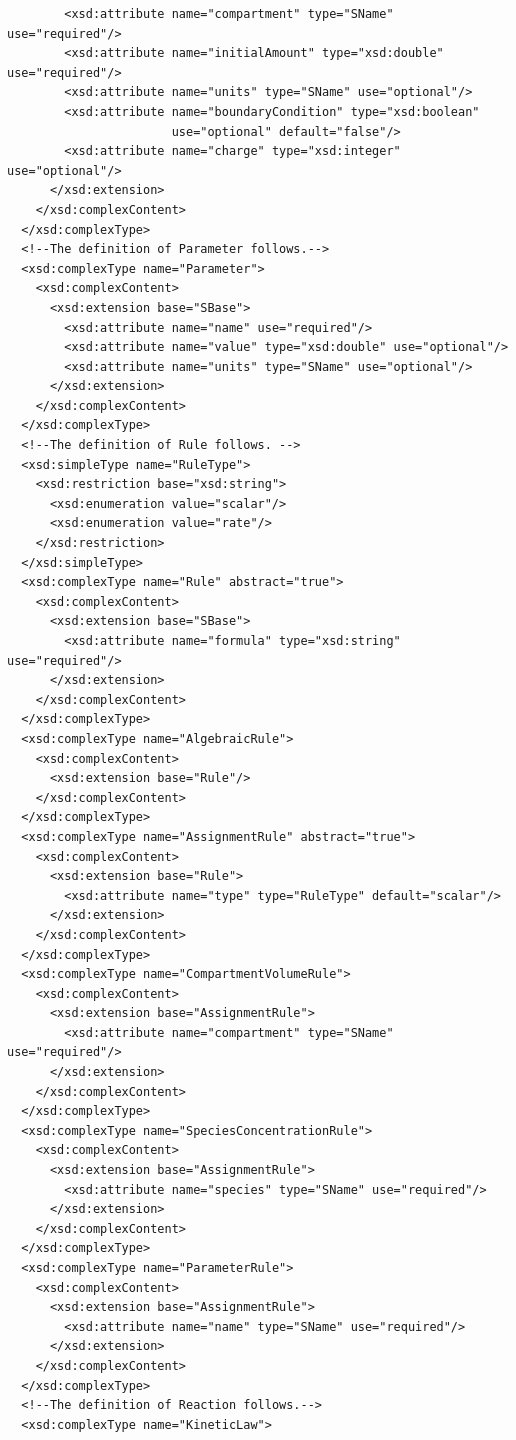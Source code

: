 \documentclass[10pt]{cekarticle}
\begin{document}
\begin{small}
\begin{verbatim}
      	<xsd:attribute name="compartment" type="SName" use="required"/>
      	<xsd:attribute name="initialAmount" type="xsd:double" use="required"/>
      	<xsd:attribute name="units" type="SName" use="optional"/>
      	<xsd:attribute name="boundaryCondition" type="xsd:boolean"
                       use="optional" default="false"/>
      	<xsd:attribute name="charge" type="xsd:integer" use="optional"/>
      </xsd:extension>
    </xsd:complexContent>
  </xsd:complexType>
  <!--The definition of Parameter follows.-->
  <xsd:complexType name="Parameter">
    <xsd:complexContent>
      <xsd:extension base="SBase">
      	<xsd:attribute name="name" use="required"/>
      	<xsd:attribute name="value" type="xsd:double" use="optional"/>
      	<xsd:attribute name="units" type="SName" use="optional"/>
      </xsd:extension>
    </xsd:complexContent>
  </xsd:complexType>
  <!--The definition of Rule follows. -->
  <xsd:simpleType name="RuleType">
    <xsd:restriction base="xsd:string">
      <xsd:enumeration value="scalar"/>
      <xsd:enumeration value="rate"/>
    </xsd:restriction>
  </xsd:simpleType>
  <xsd:complexType name="Rule" abstract="true">
    <xsd:complexContent>
      <xsd:extension base="SBase">
      	<xsd:attribute name="formula" type="xsd:string" use="required"/>
      </xsd:extension>
    </xsd:complexContent>
  </xsd:complexType>
  <xsd:complexType name="AlgebraicRule">
    <xsd:complexContent>
      <xsd:extension base="Rule"/>
    </xsd:complexContent>
  </xsd:complexType>
  <xsd:complexType name="AssignmentRule" abstract="true">
    <xsd:complexContent>
      <xsd:extension base="Rule">
      	<xsd:attribute name="type" type="RuleType" default="scalar"/>
      </xsd:extension>
    </xsd:complexContent>
  </xsd:complexType>
  <xsd:complexType name="CompartmentVolumeRule">
    <xsd:complexContent>
      <xsd:extension base="AssignmentRule">
      	<xsd:attribute name="compartment" type="SName" use="required"/>
      </xsd:extension>
    </xsd:complexContent>
  </xsd:complexType>
  <xsd:complexType name="SpeciesConcentrationRule">
    <xsd:complexContent>
      <xsd:extension base="AssignmentRule">
      	<xsd:attribute name="species" type="SName" use="required"/>
      </xsd:extension>
    </xsd:complexContent>
  </xsd:complexType>
  <xsd:complexType name="ParameterRule">
    <xsd:complexContent>
      <xsd:extension base="AssignmentRule">
      	<xsd:attribute name="name" type="SName" use="required"/>
      </xsd:extension>
    </xsd:complexContent>
  </xsd:complexType>
  <!--The definition of Reaction follows.-->
  <xsd:complexType name="KineticLaw">

\end{verbatim}
\end{small}
\end{document}
